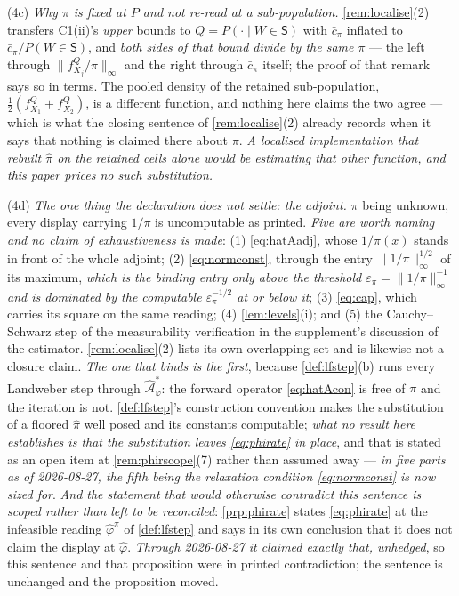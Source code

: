 \begin{remark}
\begin{enumerate}
\textup{(4c)} \emph{Why $\pi$ is fixed at $P$ and not re-read at a sub-population.}
\cref{rem:localise}\textup{(2)} transfers C1(ii)'s \emph{upper} bounds to $Q=P(\cdot\mid W\in\mathsf S)$
with $\bar c_\pi$ inflated to $\bar c_\pi/P(W\in\mathsf S)$, and \emph{both sides of that bound divide by
the same $\pi$} --- the left through $\|f^{Q}_{X_j}/\pi\|_\infty$ and the right through $\bar c_\pi$
itself; the proof of that remark says so in terms. The pooled density of the
retained sub-population, $\tfrac12(f^{Q}_{X_1}+f^{Q}_{X_2})$, is a different function, and nothing here
claims the two agree --- which is what the closing sentence of \cref{rem:localise}\textup{(2)} already
records when it says that nothing is claimed there about $\pi$. \emph{A localised implementation that
rebuilt $\hat\pi$ on the retained cells alone would be estimating that other function, and this paper
prices no such substitution.}

\textup{(4d)} \emph{The one thing the declaration does not settle: the adjoint.} $\pi$ being unknown,
every display carrying $1/\pi$ is uncomputable as printed. \emph{Five are worth naming and no claim of
exhaustiveness is made}: \textup{(1)} \eqref{eq:hatAadj}, whose $1/\pi(x)$ stands in front of the whole
adjoint; \textup{(2)} \eqref{eq:normconst}, through the entry $\|1/\pi\|_\infty^{1/2}$ of its maximum,
\emph{which is the binding entry only above the threshold
$\varepsilon_\pi=\|1/\pi\|_\infty^{-1}$ and is dominated by the computable $\varepsilon_\pi^{-1/2}$ at
or below it}; \textup{(3)} \eqref{eq:cap}, which carries its square on the same reading; \textup{(4)}
\cref{lem:levels}\textup{(i)}; and \textup{(5)}
the Cauchy--Schwarz step of the measurability verification in the supplement's discussion of the
estimator. \cref{rem:localise}\textup{(2)} lists its own overlapping set
and is likewise not a closure claim. \emph{The one that binds is the first}, because
\cref{def:lfstep}\textup{(b)} runs every Landweber step through $\hat{\mathcal A}^\ast_\varphi$: the
forward operator \eqref{eq:hatAcon} is free of $\pi$ and the iteration is not.
\cref{def:lfstep}'s construction convention makes the substitution of a floored $\hat\pi$ well posed and
its constants computable; \emph{what no result here establishes is that the substitution leaves
\eqref{eq:phirate} in place}, and that is stated as an open item at
\cref{rem:phirscope}\textup{(7)} rather than assumed away --- \emph{in five parts as of 2026-08-27, the
fifth being the relaxation condition \eqref{eq:normconst} is now sized for}.
\emph{And the statement that would otherwise contradict this sentence is scoped rather than left to be
reconciled}: \cref{prp:phirate} states \eqref{eq:phirate} at the infeasible reading $\hat\varphi^{\pi}$
of \cref{def:lfstep} and says in its own conclusion that it does not claim the display at $\hat\varphi$.
\emph{Through 2026-08-27 it claimed exactly that, unhedged}, so this sentence and that proposition were
in printed contradiction; the sentence is unchanged and the proposition moved.
\end{enumerate}
\end{remark}

